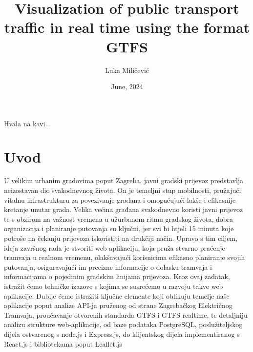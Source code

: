 \documentclass[zavrsnirad]{fer}
\title{Visualization of public transport traffic in real time using the format
	GTFS}
\author{Luka Miličević}
\date{June, 2024}
\begin{document}
\maketitle






\begin{zahvale}
  Hvala na kavi...
\end{zahvale}


\mainmatter


\tableofcontents


\chapter{Uvod}
\label{pog:uvod}

U velikim urbanim gradovima poput Zagreba, javni gradski prijevoz predstavlja neizostavan dio svakodnevnog života. On je temeljni stup mobilnosti, pružajući vitalnu infrastrukturu za povezivanje građana i omogućujući lakše i efikasnije kretanje unutar grada. Velika većina građana svakodnevno koristi javni prijevoz te s obzirom na važnost vremena u užurbanom ritmu gradskog života, dobra organizacija i planiranje putovanja su ključni, jer svi bi htjeli 15 minuta koje potroše na čekanju prijevoza iskoristiti na drukčiji način. Upravo s tim ciljem, ideja završnog rada je stvoriti web aplikaciju, koja pruža stvarno praćenje tramvaja u realnom vremenu, olakšavajući korisnicima efikasno planiranje svojih putovanja, osiguravajući im precizne informacije o dolasku tramvaja i informacijama o pojedinim gradskim linijama prijevoza. Kroz ovaj zadatak, istražit ćemo tehničke izazove s kojima se susrećemo u razvoju takve web aplikacije. Dublje ćemo istražiti ključne elemente koji oblikuju temelje naše aplikacije poput analize API-ja pruženog od strane Zagrebačkog Električnog Tramvaja, proučavanje otvorenih standarda GTFS i GTFS realtime, te detaljniju analizu strukture web-aplikacije, od baze podataka PostgreSQL, poslužiteljskog dijela ostvarenog s node.js i Express.js, do klijentskog dijela implementiranog s React.js i bibliotekama poput Leaflet.js
\end{document}

